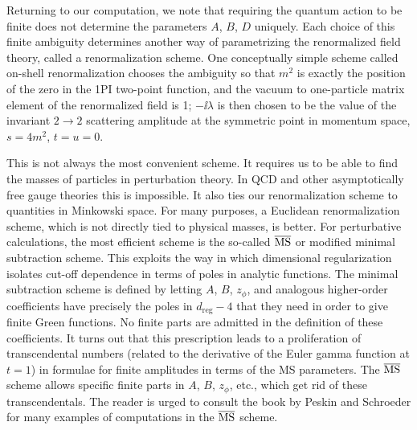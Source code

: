 Returning to our computation, we note that requiring the quantum action to be
finite does not determine the parameters $A$, $B$, $D$ uniquely. Each choice of
this finite ambiguity determines another way of parametrizing the renormalized
field theory, called a renormalization scheme. One conceptually simple scheme
called on-shell renormalization chooses the ambiguity so that $m^2$ is exactly
the position of the zero in the 1PI two-point function, and the vacuum to
one-particle matrix element of the renormalized field is 1; $-\ii\lambda$ is
then chosen to be the value of the invariant $2\to2$ scattering amplitude at
the symmetric point in momentum space, $s=4m^2$, $t=u=0$.

This is not always the most convenient scheme. It requires us to be able to
find the masses of particles in perturbation theory. In QCD and other
asymptotically free gauge theories this is impossible. It also ties our
renormalization scheme to quantities in Minkowski space. For many purposes, a
Euclidean renormalization scheme, which is not directly tied to physical
masses, is better. For perturbative calculations, the most efficient scheme is
the so-called $\overline{\rm MS}$ or modified minimal subtraction scheme. This
exploits the way in which dimensional regularization isolates cut-off
dependence in terms of poles in analytic functions. The minimal subtraction
scheme is defined by letting $A$, $B$, $z_\phi$, and analogous higher-order
coefficients have precisely the poles in $d_{\mathrm{reg}}-4$ that they need in order to give
finite Green functions. No finite parts are admitted in the definition of
these coefficients. It turns out that this prescription leads to a
proliferation of transcendental numbers (related to the derivative of the
Euler gamma function at $t=1$) in formulae for finite amplitudes in terms of
the MS parameters. The $\overline{\rm MS}$ scheme allows specific finite parts
in $A$, $B$, $z_\phi$, etc., which get rid of these transcendentals. The reader is
urged to consult the book by Peskin and Schroeder \cite{banks-ref-33} for many
examples of computations in the $\overline{\rm MS}$ scheme.
